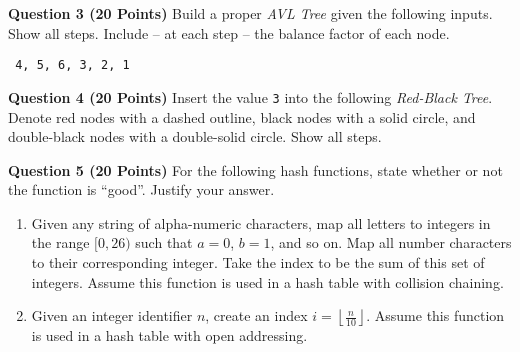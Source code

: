 \documentclass{letter}
\begin{document}
\clearpage

{\bf Question 3 (20 Points)} \kern 0.5cm Build a proper {\em AVL Tree} given the
following inputs.  Show all steps.  Include -- at each step -- the balance
factor of each node.

\begin{verbatim} 4, 5, 6, 3, 2, 1 \end{verbatim}

\clearpage

{\bf Question 4 (20 Points)} \kern 0.5cm Insert the value \texttt{3} into the
following {\em Red-Black Tree}.  Denote red nodes with a dashed outline, black
nodes with a solid circle, and double-black nodes with a double-solid circle.
Show all steps.

\begin{center}
\end{center}

\clearpage

{\bf Question 5 (20 Points)} \kern 0.5cm For the following hash functions, state
whether or not the function is ``good''.  Justify your answer.

\begin{enumerate}[label=(\alph*)]

\item Given any string of alpha-numeric characters, map all letters to integers
in the range $[0, 26)$ such that $a = 0$, $b = 1$, and so on.  Map all number
characters to their corresponding integer.  Take the index to be the sum of
this set of integers.  Assume this function is used in a hash table with
collision chaining.

\vspace{6cm}

\item Given an integer identifier $n$, create an index $i = \left \lfloor \frac{n}{10} \right \rfloor$.  Assume this function is used in a hash table with open addressing.

\end{enumerate}
\end{document}
